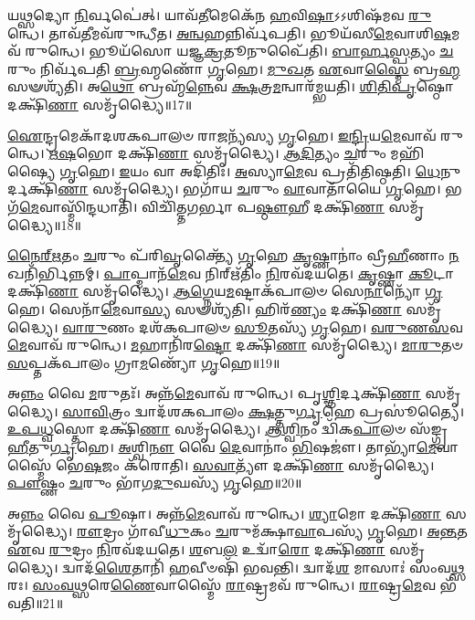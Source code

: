 𑌯\-\ul{𑌥𑍍𑌸}\-𑌦𑍍𑌯𑍋 \ul{𑌨𑌿}\-𑌰𑍍𑌵𑌪𑍇॑𑌤𑍍।
𑌯𑌾𑌵᳴\-\ul{𑌤𑍀}\-𑌮𑍇𑌕𑍇᳴𑌨 \ul{𑌹}\-𑌵𑌿\-\ul{𑌷𑌾}\-\-𑌽𑌽𑌶𑌿𑌷᳴𑌮𑌵 \ul{𑌰𑍁}\-𑌨𑍍𑌧𑍇।
𑌤𑌾𑌵᳴\-\ul{𑌤𑍀}\-𑌮𑌵᳴𑌰𑍁𑌨𑍍𑌧𑍀𑌤।
\-\ul{𑌅}\-\-\ul{𑌨𑍍𑌵}\-𑌹𑌨𑍍𑌨𑌿𑌰𑍍𑌵᳴𑌪𑌤𑌿।
𑌭𑍂𑌯᳴𑌸𑍀\-\ul{𑌮𑍇}\-𑌵𑌾𑌶𑌿\-\ul{𑌷}\-𑌮𑌵᳴ 𑌰𑍁𑌨𑍍𑌧𑍇।
𑌭𑍂𑌯᳴𑌸𑍋 𑌯𑌜𑍍𑌞\-\ul{𑌕𑍍𑌰}\-𑌤𑍂𑌨𑍁𑌪𑍈᳴𑌤𑌿।
\-\ul{𑌬𑌾}\-\-\ul{𑌰𑍍}\-\-\ul{𑌹}\-\-\ul{𑌸𑍍𑌪}\-𑌤𑍍𑌯𑌂 \ul{𑌚}\-𑌰𑍁𑌂 𑌨𑌿𑌰𑍍𑌵᳴𑌪𑌤𑌿 \ul{𑌬𑍍𑌰}\-𑌹𑍍𑌮𑌣𑍋᳴ \ul{𑌗𑍃}\-𑌹𑍇।
\-\ul{𑌮𑍁}\-\-\ul{𑌖}\-𑌤 \ul{𑌏}\-𑌵𑌾\-\ul{𑌸𑍍𑌮𑍈} 𑌬𑍍𑌰\-\ul{𑌹𑍍𑌮} 𑌸𑍟𑌶𑍍𑌯᳴𑌤𑌿।
𑌅\-\ul{𑌥𑍋} 𑌬𑍍𑌰𑌹𑍍𑌮᳴\-\ul{𑌨𑍍𑌨𑍇}\-𑌵 \ul{𑌕𑍍𑌷}\-𑌤𑍍𑌰\-\ul{𑌮}\-𑌨𑍍𑌵𑌾𑌰᳴𑌮𑍍𑌭𑌯𑌤𑌿।
\-\ul{𑌶𑌿}\-\-\ul{𑌤𑌿}\-\-\ul{𑌪𑍃}\-𑌷𑍍𑌠𑍋 𑌦𑌕𑍍𑌷𑌿᳴\-\ul{𑌣𑌾} 𑌸𑌮𑍃᳴𑌦𑍍𑌧𑍍𑌯𑍈॥17॥

\-\ul{𑌐}\-𑌨𑍍𑌦𑍍𑌰𑌮𑍇𑌕𑌾᳴\-𑌦𑌶\-𑌕𑌪𑌾𑌲𑍞 𑌰𑌾\-\ul{𑌜}\-𑌨𑍍𑌯᳴𑌸𑍍𑌯 \ul{𑌗𑍃}\-𑌹𑍇।
\-\ul{𑌇}\-\-\ul{𑌨𑍍𑌦𑍍𑌰𑌿}\-𑌯\-\ul{𑌮𑍇}\-𑌵𑌾𑌵᳴ 𑌰𑍁𑌨𑍍𑌧𑍇।
\-\ul{𑌋}\-\-\ul{𑌷}\-𑌭𑍋 𑌦𑌕𑍍𑌷𑌿᳴\-\ul{𑌣𑌾} 𑌸𑌮𑍃᳴𑌦𑍍𑌧𑍍𑌯𑍈।
\-\ul{𑌆}\-\-\ul{𑌦𑌿}\-𑌤𑍍𑌯𑌂 \ul{𑌚}\-𑌰𑍁𑌂 𑌮𑌹𑌿᳴𑌷𑍍𑌯𑍈 \ul{𑌗𑍃}\-𑌹𑍇।
\-\ul{𑌇}\-𑌯𑌂 𑌵𑌾 𑌅𑌦𑌿᳴𑌤𑌿𑌃।
\-\ul{𑌅}\-𑌸𑍍𑌯𑌾\-\ul{𑌮𑍇}\-𑌵 𑌪𑍍𑌰𑌤𑌿᳴𑌤𑌿𑌷𑍍𑌠𑌤𑌿।
\-\ul{𑌧𑍇}\-𑌨𑍁𑌰𑍍𑌦𑌕𑍍𑌷𑌿᳴\-\ul{𑌣𑌾} 𑌸𑌮𑍃᳴𑌦𑍍𑌧𑍍𑌯𑍈।
𑌭𑌗𑌾᳴𑌯 \ul{𑌚}\-𑌰𑍁𑌂 \ul{𑌵𑌾}\-𑌵𑌾𑌤𑌾᳴𑌯𑍈 \ul{𑌗𑍃}\-𑌹𑍇।
𑌭𑌗᳴\-\ul{𑌮𑍇}\-𑌵𑌾𑌸𑍍𑌮𑌿᳴𑌨𑍍𑌦𑌧𑌾𑌤𑌿।
𑌵𑌿𑌚𑌿᳴𑌤𑍍𑌤𑌗𑌰𑍍𑌭𑌾 𑌪\-\ul{𑌷𑍍𑌠𑍗}\-𑌹𑍀 𑌦𑌕𑍍𑌷𑌿᳴\-\ul{𑌣𑌾} 𑌸𑌮𑍃᳴𑌦𑍍𑌧𑍍𑌯𑍈॥18॥

\-\ul{𑌨𑍈}\-\-\ul{𑌰𑍍}\-\-\ul{𑌋}\-𑌤𑌂 \ul{𑌚}\-𑌰𑍁𑌂 𑌪᳴𑌰𑌿\-\ul{𑌵𑍃}\-𑌕𑍍𑌤𑍍𑌯𑍈᳴ \ul{𑌗𑍃}\-𑌹𑍇 \ul{𑌕𑍃}\-𑌷𑍍𑌣𑌾𑌨𑌾𑌂॑ 𑌵𑍍𑌰𑍀\-\ul{𑌹𑍀}\-𑌣𑌾𑌂 \ul{𑌨}\-𑌖𑌨𑌿᳴𑌰𑍍𑌭𑌿𑌨𑍍𑌨𑌮𑍍।
\-\ul{𑌪𑌾}\-𑌪𑍍𑌮𑌾𑌨᳴\-\ul{𑌮𑍇}\-𑌵 𑌨𑌿𑌰𑍍\mbox{}𑌋᳴𑌤𑌿𑌂 \ul{𑌨𑌿}\-𑌰𑌵᳴𑌦𑌯𑌤𑍇।
\-\ul{𑌕𑍃}\-𑌷𑍍𑌣𑌾 \ul{𑌕𑍂}\-𑌟𑌾 𑌦𑌕𑍍𑌷𑌿᳴\-\ul{𑌣𑌾} 𑌸𑌮𑍃᳴𑌦𑍍𑌧𑍍𑌯𑍈।
\-\ul{𑌆}\-\-\ul{𑌗𑍍𑌨𑍇}\-𑌯\-\ul{𑌮}\-𑌷𑍍𑌟𑌾\-𑌕᳴𑌪𑌾𑌲𑍞 𑌸𑍇\-\ul{𑌨𑌾}\-𑌨𑍍𑌯𑍋᳴ \ul{𑌗𑍃}\-𑌹𑍇।
𑌸𑍇𑌨𑌾᳴\-\ul{𑌮𑍇}\-𑌵𑌾\-\ul{𑌸𑍍𑌯} 𑌸𑍟𑌶𑍍𑌯᳴𑌤𑌿।
𑌹𑌿𑌰᳴\-\ul{𑌣𑍍𑌯𑌂} 𑌦𑌕𑍍𑌷𑌿᳴\-\ul{𑌣𑌾} 𑌸𑌮𑍃᳴𑌦𑍍𑌧𑍍𑌯𑍈।
\-\ul{𑌵𑌾}\-\-\ul{𑌰𑍁}\-𑌣𑌂 𑌦𑌶᳴𑌕𑌪𑌾𑌲𑍞 \ul{𑌸𑍂}\-𑌤𑌸𑍍𑌯᳴ \ul{𑌗𑍃}\-𑌹𑍇।
\-\ul{𑌵}\-\-\ul{𑌰𑍁}\-\-\ul{𑌣}\-\-\ul{𑌸}\-𑌵\-\ul{𑌮𑍇}\-𑌵𑌾𑌵᳴ 𑌰𑍁𑌨𑍍𑌧𑍇।
\-\ul{𑌮}\-𑌹𑌾𑌨𑌿᳴𑌰\-\ul{𑌷𑍍𑌟𑍋} 𑌦𑌕𑍍𑌷𑌿᳴\-\ul{𑌣𑌾} 𑌸𑌮𑍃᳴𑌦𑍍𑌧𑍍𑌯𑍈।
\-\ul{𑌮𑌾}\-\-\ul{𑌰𑍁}\-𑌤𑍞 \ul{𑌸}\-𑌪𑍍𑌤𑌕᳴𑌪𑌾𑌲𑌂 𑌗𑍍𑌰𑌾\-\ul{𑌮}\-𑌣𑍍𑌯𑍋᳴ \ul{𑌗𑍃}\-𑌹𑍇॥19॥

𑌅\-\ul{𑌨𑍍𑌨𑌂} 𑌵𑍈 \ul{𑌮}\-𑌰𑍁𑌤𑌃᳴।
𑌅𑌨𑍍𑌨᳴\-\ul{𑌮𑍇}\-𑌵𑌾𑌵᳴ 𑌰𑍁𑌨𑍍𑌧𑍇।
𑌪𑍃\-\ul{𑌶𑍍𑌞𑌿}\-𑌰𑍍𑌦𑌕𑍍𑌷𑌿᳴\-\ul{𑌣𑌾} 𑌸𑌮𑍃᳴𑌦𑍍𑌧𑍍𑌯𑍈।
\-\ul{𑌸𑌾}\-\-\ul{𑌵𑌿}\-𑌤𑍍𑌰𑌂 𑌦𑍍𑌵𑌾𑌦᳴𑌶𑌕𑌪𑌾𑌲𑌂 \ul{𑌕𑍍𑌷}\-𑌤𑍍𑌤𑍁\-\ul{𑌰𑍍𑌗𑍃}\-𑌹𑍇 𑌪𑍍𑌰𑌸𑍂॑𑌤𑍍𑌯𑍈।
\-\ul{𑌉}\-\-\ul{𑌪}\-\-\ul{𑌧𑍍𑌵}\-𑌸𑍍𑌤𑍋 𑌦𑌕𑍍𑌷𑌿᳴\-\ul{𑌣𑌾} 𑌸𑌮𑍃᳴𑌦𑍍𑌧𑍍𑌯𑍈।
\-\ul{𑌆}\-\-\ul{𑌶𑍍𑌵𑌿}\-𑌨𑌂 𑌦𑍍𑌵𑌿᳴𑌕\-\ul{𑌪𑌾}\-𑌲𑍞 𑌸᳴𑌙𑍍𑌗𑍍𑌰\-\ul{𑌹𑍀}\-𑌤𑍁\-\ul{𑌰𑍍𑌗𑍃}\-𑌹𑍇।
\-\ul{𑌅}\-𑌶𑍍𑌵𑌿\-\ul{𑌨𑍗} 𑌵𑍈 \ul{𑌦𑍇}\-𑌵𑌾𑌨𑌾𑌂॑ \ul{𑌭𑌿}\-𑌷𑌜𑍗॑।
𑌤𑌾𑌭𑍍𑌯𑌾᳴\-\ul{𑌮𑍇}\-𑌵𑌾𑌸𑍍𑌮𑍈᳴ 𑌭𑍇\-\ul{𑌷}\-𑌜𑌂 𑌕᳴𑌰𑍋𑌤𑌿।
\-\ul{𑌸}\-\-\ul{𑌵𑌾}\-𑌤𑍍𑌯𑍗᳴ 𑌦𑌕𑍍𑌷𑌿᳴\-\ul{𑌣𑌾} 𑌸𑌮𑍃᳴𑌦𑍍𑌧𑍍𑌯𑍈।
\-\ul{𑌪𑍗}\-𑌷𑍍𑌣𑌂 \ul{𑌚}\-𑌰𑍁𑌂 𑌭𑌾᳴𑌗\-\ul{𑌦𑍁}\-𑌘𑌸𑍍𑌯᳴ \ul{𑌗𑍃}\-𑌹𑍇॥20॥

𑌅\-\ul{𑌨𑍍𑌨𑌂} 𑌵𑍈 \ul{𑌪𑍂}\-𑌷𑌾।
𑌅𑌨𑍍𑌨᳴\-\ul{𑌮𑍇}\-𑌵𑌾𑌵᳴ 𑌰𑍁𑌨𑍍𑌧𑍇।
\-\ul{𑌶𑍍𑌯𑌾}\-𑌮𑍋 𑌦𑌕𑍍𑌷𑌿᳴\-\ul{𑌣𑌾} 𑌸𑌮𑍃᳴𑌦𑍍𑌧𑍍𑌯𑍈।
\-\ul{𑌰𑍗}\-𑌦𑍍𑌰𑌂 𑌗𑌾᳴𑌵𑍀\-\ul{𑌧𑍁}\-𑌕𑌂 \ul{𑌚}\-𑌰𑍁𑌮᳴𑌕𑍍𑌷𑌾\-\ul{𑌵𑌾}\-𑌪𑌸𑍍𑌯᳴ \ul{𑌗𑍃}\-𑌹𑍇।
\-\ul{𑌅}\-\-\ul{𑌨𑍍𑌤}\-𑌤 \ul{𑌏}\-𑌵 \ul{𑌰𑍁}\-𑌦𑍍𑌰𑌂 \ul{𑌨𑌿}\-𑌰𑌵᳴𑌦𑌯𑌤𑍇।
\-\ul{𑌶}\-𑌬\-\ul{𑌲} 𑌉𑌦𑍍𑌵𑌾᳴\-\ul{𑌰𑍋} 𑌦𑌕𑍍𑌷𑌿᳴\-\ul{𑌣𑌾} 𑌸𑌮𑍃᳴𑌦𑍍𑌧𑍍𑌯𑍈।
𑌦𑍍𑌵𑌾𑌦᳴\-\ul{𑌶𑍈}\-𑌤𑌾𑌨𑌿᳴ \ul{𑌹}\-𑌵𑍀𑍞𑌷𑌿᳴ 𑌭𑌵𑌨𑍍𑌤𑌿।
𑌦𑍍𑌵𑌾𑌦᳴\-\ul{𑌶} 𑌮𑌾𑌸𑌾𑌃॑ 𑌸𑌂𑌵\-\ul{𑌥𑍍𑌸}\-𑌰𑌃।
\-\ul{𑌸𑌂}\-\-\ul{𑌵}\-\-\ul{𑌥𑍍𑌸}\-𑌰𑍇\-\ul{𑌣𑍈}\-𑌵𑌾𑌸𑍍𑌮𑍈᳴ \ul{𑌰𑌾}\-𑌷𑍍𑌟𑍍𑌰𑌮𑌵᳴ 𑌰𑍁𑌨𑍍𑌧𑍇।
\-\ul{𑌰𑌾}\-𑌷𑍍𑌟𑍍𑌰\-\ul{𑌮𑍇}\-𑌵 𑌭᳴𑌵𑌤𑌿॥21॥

